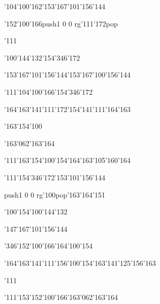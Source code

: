 \null\vfill\ipa\centerline{\enskip\enskip\enskip\enskip\char'104\char'100\char'162\enskip\char'153\char'167\char'101\char'156\char'144}\medskip\centerline{\enskip\enskip\enskip\char'152\char'100\char'166\enskip\enskip\enskip\enskip\enskip\enskip\pdfcolorstack\match push{1 0 0 rg}\char'111\char'172\pdfcolorstack\match pop{}}\medskip\centerline{\enskip\char'111\enskip\enskip\enskip\enskip\enskip\enskip\enskip\enskip\enskip\enskip}\medskip\centerline{\enskip\enskip\enskip\enskip\char'100\char'144\char'132\enskip\enskip\enskip\enskip\char'154\char'346\char'172}\medskip\centerline{\enskip\enskip\enskip\enskip\enskip\char'153\char'167\char'101\char'156\char'144\enskip\char'153\char'167\char'100\char'156\char'144\enskip\enskip\enskip}\medskip\centerline{\enskip\char'111\enskip\char'104\char'100\char'166\enskip\char'154\char'346\char'172\enskip\enskip\enskip\enskip\enskip\enskip\enskip}\medskip\centerline{\enskip\char'164\char'163\char'141\char'111\char'172\enskip\enskip\enskip\enskip\char'154\char'141\char'111\char'164\char'163\enskip\enskip\enskip}\medskip\centerline{\enskip\enskip\enskip\char'163\char'154\char'100\enskip\enskip\enskip\enskip\enskip\enskip}\medskip\centerline{\enskip\enskip\enskip\enskip\enskip\enskip\enskip\enskip\enskip\enskip\enskip\char'163\char'062\char'163\char'164}\medskip\vfill\footline{\hfil\tt\folio\hfil}\eject
\null\vfill\ipa\centerline{\enskip\char'111\char'163\enskip\char'154\char'100\char'154\enskip\char'164\char'163\char'105\char'160\char'164}\medskip\centerline{\enskip\char'111\enskip\char'154\char'346\char'172\enskip\char'153\char'101\char'156\char'144\enskip\enskip\enskip}\medskip\centerline{\enskip\pdfcolorstack\match push{1 0 0 rg}\char'100\pdfcolorstack\match pop{}\enskip\char'163\char'164\char'151\enskip\enskip\enskip\enskip\enskip\enskip}\medskip\centerline{\enskip\char'100\char'154\enskip\char'100\char'144\char'132\enskip\enskip\enskip\enskip\enskip\enskip\enskip}\medskip\centerline{\enskip\enskip\enskip\enskip\enskip\enskip\enskip\enskip\enskip\enskip\enskip\char'147\char'167\char'101\char'156\char'144\enskip\enskip\enskip}\medskip\centerline{\enskip\char'346\enskip\char'152\char'100\char'166\enskip\enskip\enskip\enskip\enskip\char'164\char'100\char'154\enskip\enskip\enskip}\medskip\centerline{\enskip\char'164\char'163\char'141\char'111\char'156\enskip\char'100\char'154\enskip\char'163\char'141\char'125\char'156\char'163\enskip\enskip\enskip}\medskip\centerline{\enskip\char'111\enskip\enskip\enskip\enskip\enskip\enskip\enskip\enskip\enskip\enskip}\medskip\centerline{\enskip\char'111\char'153\enskip\enskip\enskip\enskip\char'152\char'100\char'166\enskip\char'163\char'062\char'163\char'164}\medskip\vfill\footline{\hfil\tt\folio\hfil}\eject
